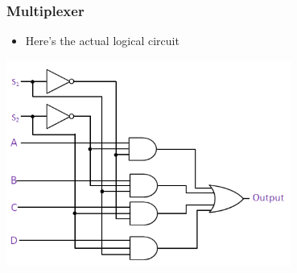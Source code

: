 \documentclass{beamer}
\begin{document}
\begin{frame}
\begin{tikzpicture}[x=0.75pt,y=0.75pt,yscale=-1,xscale=1]
\end{tikzpicture}

             \end{frame}
             
             \begin{frame}
             	\frametitle{Multiplexer}
             	\begin{itemize}
             		\item Here's the actual logical circuit
             	\end{itemize}
             	\centering
             	\includegraphics[width=0.7\textwidth]{multiplexer}
             \end{frame}
\end{document}
